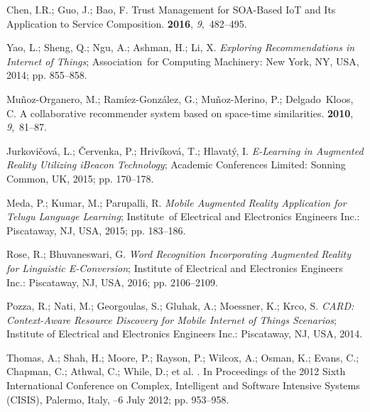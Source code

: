 \documentclass[symmetry,article,accept,moreauthors,pdftex10pt,a4paper]{mdpi}
\begin{document}
\begin{thebibliography}{999}
Chen, I.R.; Guo, J.; Bao, F.
\newblock Trust Management for SOA-Based IoT and Its Application to Service
Composition.
 {\bf 2016}, {\em
	9},~482--495.

Yao, L.; Sheng, Q.; Ngu, A.; Ashman, H.; Li, X.
\newblock \emph{Exploring Recommendations in Internet of Things};
\newblock Association~for Computing Machinery: New York, NY, USA, 2014; pp. 855--858.

Muñoz-Organero, M.; Ramíez-González, G.; Muñoz-Merino, P.; Delgado~Kloos,
C.
\newblock A collaborative recommender system based on space-time similarities.
 {\bf 2010}, {\em 9},~81--87.

Jurkovičová, L.; Červenka, P.; Hrivíková, T.; Hlavatý, I.
\newblock \emph{E-Learning in Augmented Reality Utilizing iBeacon Technology};
\newblock Academic Conferences Limited: Sonning Common, UK, 2015; pp. 170--178.

Meda, P.; Kumar, M.; Parupalli, R.
\newblock \emph{Mobile Augmented Reality Application for Telugu Language Learning};
\newblock Institute~of Electrical and Electronics Engineers Inc.: Piscataway, NJ, USA, 2015; pp.
183--186.

Rose, R.; Bhuvaneswari, G.
\newblock \emph{Word Recognition Incorporating Augmented Reality for Linguistic
	E-Conversion};
\newblock Institute of Electrical and Electronics Engineers Inc.: Piscataway, NJ, USA, 2016; pp.
2106--2109.

Pozza, R.; Nati, M.; Georgoulas, S.; Gluhak, A.; Moessner, K.; Krco, S.
\newblock\emph{ CARD: Context-Aware Resource Discovery for Mobile Internet of Things
	Scenarios};
\newblock Institute of Electrical and Electronics Engineers Inc.: Piscataway, NJ, USA, 2014.

Thomas, A.; Shah, H.; Moore, P.; Rayson, P.; Wilcox, A.; Osman, K.; Evans, C.;
Chapman, C.; Athwal, C.; While, D.; et al.
. In Proceedings of the 2012 Sixth International Conference on  Complex, Intelligent and Software Intensive Systems (CISIS), Palermo, Italy, 
--6 July 2012; pp. 953--958.


\end{thebibliography}
\end{document}
